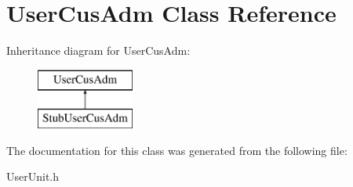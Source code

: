 \hypertarget{classUserCusAdm}{\section{User\-Cus\-Adm Class Reference}
\label{d1/d48/classUserCusAdm}
}
Inheritance diagram for User\-Cus\-Adm\-:\begin{figure}[H]
\begin{center}
\leavevmode
\includegraphics[height=2.000000cm]{d1/d48/classUserCusAdm}
\end{center}
\end{figure}


The documentation for this class was generated from the following file\-:\begin{DoxyCompactItemize}
\item 
User\-Unit.\-h\end{DoxyCompactItemize}

